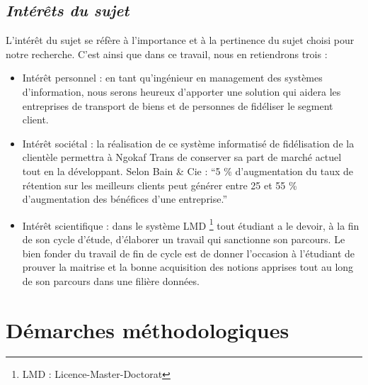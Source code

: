         \subsection[Interet du sujet]{\textit{Intérêts du sujet}}
        L’intérêt du sujet se réfère à l’importance et à la pertinence du sujet choisi pour notre recherche.
        C’est ainsi que dans ce travail, nous en retiendrons trois :
         \par 
            \begin{itemize}
                \setlength{\itemsep}{0pt}
                \item [\ding{226}] Intérêt personnel : en tant qu’ingénieur en management 
                des systèmes d’information, nous serons heureux d’apporter une solution
                qui aidera les entreprises de transport de biens et de personnes de fidéliser
                le segment client.
                \item [\ding{226}] Intérêt sociétal : la réalisation de ce système
                informatisé de fidélisation de la clientèle permettra à Ngokaf Trans
                de conserver sa part de marché actuel tout en la développant. 
                Selon Bain \& Cie : \enquote{5 \% d’augmentation du taux de
                rétention sur les meilleurs clients peut générer entre 25 et 55 \%
                d’augmentation des bénéfices d’une entreprise.} \cite*{Siecdigi}
                \item [\ding{226}] Intérêt scientifique : dans le système LMD
                \footnote[1]{LMD : Licence-Master-Doctorat} tout étudiant
                a le devoir, à la fin de son cycle d’étude, d’élaborer un travail qui
                sanctionne son parcours. Le bien fonder du travail de fin de cycle
                est de donner l’occasion à l’étudiant de prouver la maitrise et la bonne acquisition
                des notions apprises tout au long de son parcours dans une filière données.
            \end{itemize}
    \section[Démarches méthodologiques]{Démarches méthodologiques}
